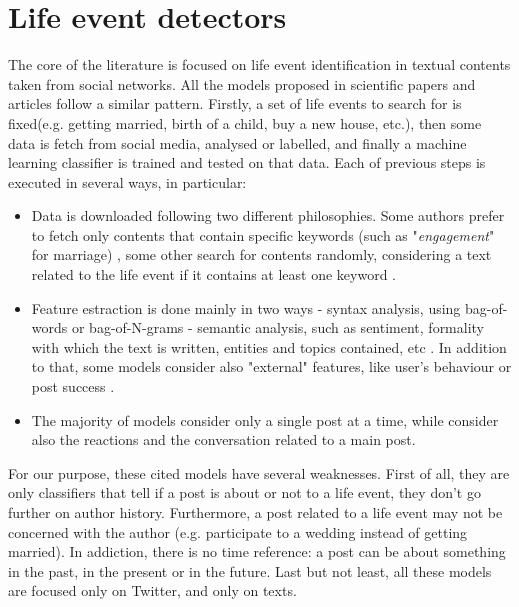 \section{Life event detectors}
\label{sec:classifiers}
The core of the literature is focused on life event identification in textual contents taken from social networks. All the models proposed in scientific papers and articles follow a similar pattern. Firstly, a set of life events to search for is fixed(e.g. getting married, birth of a child, buy a new house, etc.), then some data is fetch from social media, analysed or labelled, and finally a machine learning classifier is trained and tested on that data. Each of previous steps is executed in several ways, in particular:
\begin{itemize}
\item Data is downloaded following two different philosophies. Some authors prefer to fetch only contents that contain specific keywords (such as "\textit{engagement}" for marriage) \cite{dickinson2015identifying, cavalinclassification, moyanolife, khobarekar2013detecting}, some other search for contents randomly, considering a text related to the life event if it contains at least one keyword \cite{choudhury2014personal, di2013detecting}.
\item Feature estraction is done mainly in two ways - syntax analysis, using bag-of-words or bag-of-N-grams \cite{cavalinclassification, di2013detecting, li2014major} - semantic analysis, such as sentiment, formality with which the text is written, entities and topics contained, etc \cite{khobarekar2013detecting}. In addition to that, some models consider also "external" features, like user's behaviour or post success \cite{dickinson2015identifying}.
\item The majority of models consider only a single post at a time, while \cite{cavalin2015multiple, moyanolife} consider also the reactions and the conversation related to a main post.
\end{itemize}

For our purpose, these cited models have several weaknesses. First of all, they are only classifiers that tell if a post is about or not to a life event, they don't go further on author history. Furthermore, a post related to a life event may not be concerned with the author (e.g. participate to a wedding instead of getting married). In addiction, there is no time reference: a post can be about something in the past, in the present or in the future. Last but not least, all these models are focused only on Twitter, and only on texts.

